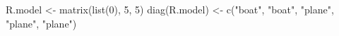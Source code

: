 \begin{Schunk}
\begin{Sinput}
 R.model <- matrix(list(0), 5, 5)
 diag(R.model) <- c("boat", "boat", "plane", "plane", "plane")
\end{Sinput}
\end{Schunk}
